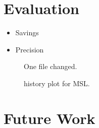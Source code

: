 \documentclass{cslthse-msc}
\begin{document}
\chapter[Evaluation]{Evaluation}
\begin{itemize}
	\item Savings
	\item Precision
\end{itemize}

\begin{figure}
    \centering
    \caption{One file changed.}
    \label{fig:onefile}
\end{figure}

\begin{figure}
    \centering
    \caption{history plot for MSL.}
    \label{fig:mslhistory}
\end{figure}

\chapter[Future Work]{Future Work}
	
\end{document}
